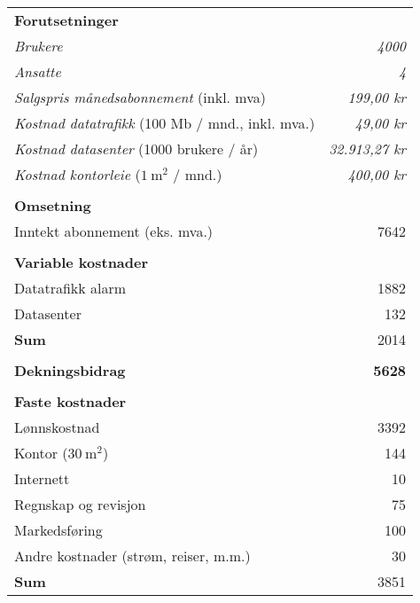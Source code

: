 \begin{table}
  \centering
  \begin{tabular}{lr}
    \textbf{Forutsetninger} & \\
    \textit{Brukere}                                           & \textit{4000} \\
    \textit{Ansatte}                                           & \textit{4} \\
    \textit{Salgspris månedsabonnement} (inkl. mva)            & \textit{199,00 kr} \\
    \textit{Kostnad datatrafikk} (100 Mb / mnd., inkl. mva.)   & \textit{49,00 kr} \\
    \textit{Kostnad datasenter} (1000 brukere / år)            & \textit{32.913,27 kr} \\
    \textit{Kostnad kontorleie} ($1~\text{m}^2$ / mnd.)        & \textit{400,00 kr} \\
    \\
    \textbf{Omsetning} & \\
    Inntekt abonnement (eks. mva.)                    &  7642 \\
    \\
    \textbf{Variable kostnader} & \\
    Datatrafikk alarm                                 &  1882 \\
    Datasenter                                        &   132 \\
    \textbf{Sum}                                      &  2014 \\
    \\
    \textbf{Dekningsbidrag}                           &  \textbf{5628} \\
    \hline
    \\
    \textbf{Faste kostnader}                       & \\
    Lønnskostnad                                      &  3392 \\
    Kontor             ($30~\text{m}^2$)              &   144 \\
    Internett                                         &    10 \\
    Regnskap og revisjon                              &    75 \\
    Markedsføring                                     &   100 \\
    Andre kostnader (strøm, reiser, m.m.)             &    30 \\
    \textbf{Sum}                                      &  3851 \\

\end{tabular}
\end{table}
